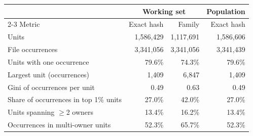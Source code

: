 \begin{tabular}{lrrr}
\toprule
 & \multicolumn{2}{c}{Working set} & Population \\
\cmidrule(lr){2-3}
Metric & Exact hash & Family & Exact hash \\
\midrule
Units & 1,586,429 & 1,117,691 & 1,586,606 \\
File occurrences & 3,341,056 & 3,341,056 & 3,341,439 \\
Units with one occurrence & 79.6\% & 74.3\% & 79.6\% \\
Largest unit (occurrences) & 1,409 & 6,847 & 1,409 \\
Gini of occurrences per unit & 0.49 & 0.63 & 0.49 \\
Share of occurrences in top 1\% units & 27.0\% & 42.0\% & 27.0\% \\
Units spanning $\geq$2 owners & 13.4\% & 16.2\% & 13.4\% \\
Occurrences in multi-owner units & 52.3\% & 65.7\% & 52.3\% \\
\bottomrule
\end{tabular}
